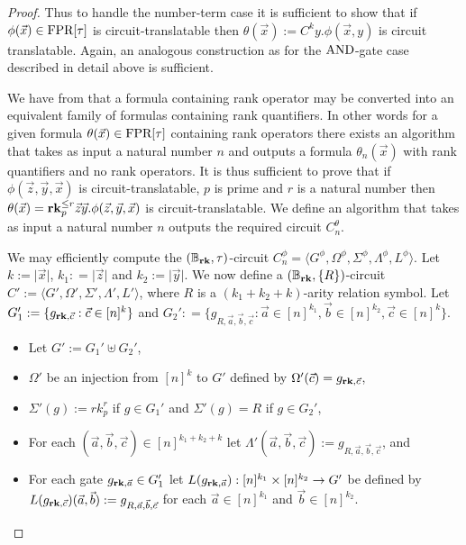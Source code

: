 \documentclass[../paper.tex]{subfiles}
\begin{document}
\begin{proof}
  Thus to handle the number-term case it is sufficient to show that if
  $\phi(\vec{x}) \in \text{\upshape FPR}[\tau]$ is circuit-translatable then $\theta(\vec{x})
  := C^{k}y. \phi(\vec{x}, y)$ is circuit translatable. Again, an analogous
  construction as for the $\text{\upshape AND}$-gate case described in detail above is
  sufficient.

  We have from \cite{} that a formula containing rank operator may be converted
  into an equivalent family of formulas containing rank quantifiers. In other
  words for a given formula $\theta(\vec{x}) \in \text{\upshape FPR}[\tau]$ containing rank
  operators there exists an algorithm that takes as input a natural number $n$
  and outputs a formula $\theta_n(\vec{x})$ with rank quantifiers and no rank
  operators. It is thus sufficient to prove that if $\phi(\vec{z}, \vec{y},
  \vec{x})$ is circuit-translatable, $p$ is prime and $r$ is a natural number
  then $\theta(\vec{x}) = \text{\textbf{rk}}^{\leq r}_p \vec{z} \vec{y}. \phi(\vec{z},
  \vec{y}, \vec{x})$ is circuit-translatable. We define an algorithm that takes
  as input a natural number $n$ outputs the required circuit $C^{\theta}_n$.

  We may efficiently compute the $(\mathbb{B}_{\text{\textbf{rk}}}, \tau)$-circuit
  $C^{\phi}_n = \langle G^{\phi}, \Omega^{\phi}, \Sigma^{\phi}, \Lambda^{\phi},
  L^{\phi} \rangle$. Let $k:= \vert \vec{x} \vert$, $k_1 : = \vert \vec{z}
  \vert$ and $k_2 := \vert \vec{y} \vert$. We now define a $(\mathbb{B}_{\text{\textbf{rk}}},
  \{ R \})$-circuit $C':= \langle G', \Omega', \Sigma', \Lambda', L'\rangle$,
  where $R$ is a $(k_1 + k_2 +k)$-arity relation symbol. Let $G_1' :=
  \{g_{\text{\textbf{rk}}, \vec{c}} : \vec{c} \in [n]^k\}$ and $G_2' : = \{ g_{R, \vec{a},
    \vec{b}, \vec{c}} : \vec{a} \in [n]^{k_1}, \vec{b} \in [n]^{k_2}, \vec{c}
  \in [n]^{k}\}$.

  \begin{itemize}
    \setlength\itemsep{0mm}
  \item Let $G' := G_1' \uplus G_2'$,
  \item $\Omega'$ be an injection from $[n]^k$ to $G'$ defined by
    $\Omega'(\vec{c}) = g_{\text{\textbf{rk}}, \vec{c}}$,

  \item $\Sigma' (g) := rk^r_p$ if $g \in G_1'$ and $\Sigma'(g) = R$ if $g \in
    G_2'$,
  \item For each $(\vec{a}, \vec{b}, \vec{c}) \in [n]^{k_1 +k_2 + k}$ let
    $\Lambda' (\vec{a}, \vec{b}, \vec{c}) := g_{R, \vec{a}, \vec{b}, \vec{c}}$,
    and

  \item For each gate $g_{\text{\textbf{rk}}, \vec{a}} \in G_1'$ let $L(g_{\text{\textbf{rk}}, \vec{a}}):
    [n]^{k_1} \times [n]^{k_2} \rightarrow G'$ be defined by $L(g_{\text{\textbf{rk}},
      \vec{c}})(\vec{a}, \vec{b}) := g_{R, \vec{a}, \vec{b}, \vec{c}}$ for each
    $\vec{a} \in [n]^{k_1}$ and $\vec{b} \in [n]^{k_2}$.


\end{itemize}
\end{proof}
\end{document}
